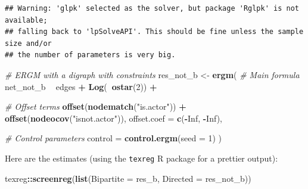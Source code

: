 \documentclass[]{book}
\newenvironment{Shaded}{\begin{snugshade}}{\end{snugshade}}
\newcommand{\CommentTok}[1]{\textcolor[rgb]{0.56,0.35,0.01}{\textit{#1}}}
\newcommand{\DataTypeTok}[1]{\textcolor[rgb]{0.13,0.29,0.53}{#1}}
\newcommand{\DecValTok}[1]{\textcolor[rgb]{0.00,0.00,0.81}{#1}}
\newcommand{\KeywordTok}[1]{\textcolor[rgb]{0.13,0.29,0.53}{\textbf{#1}}}
\newcommand{\NormalTok}[1]{#1}
\newcommand{\OperatorTok}[1]{\textcolor[rgb]{0.81,0.36,0.00}{\textbf{#1}}}
\newcommand{\OtherTok}[1]{\textcolor[rgb]{0.56,0.35,0.01}{#1}}
\newcommand{\StringTok}[1]{\textcolor[rgb]{0.31,0.60,0.02}{#1}}
\begin{document}
\begin{verbatim}
## Warning: 'glpk' selected as the solver, but package 'Rglpk' is not available;
## falling back to 'lpSolveAPI'. This should be fine unless the sample size and/or
## the number of parameters is very big.
\end{verbatim}

\begin{Shaded}
\begin{Highlighting}[]
\CommentTok{# ERGM with a digraph with constraints}
\NormalTok{res_not_b <-}\StringTok{ }\KeywordTok{ergm}\NormalTok{(}
  \CommentTok{# Main formula}
\NormalTok{  net_not_b }\OperatorTok{~}\StringTok{ }\NormalTok{edges }\OperatorTok{+}\StringTok{ }\KeywordTok{Log}\NormalTok{(}\OperatorTok{~}\KeywordTok{ostar}\NormalTok{(}\DecValTok{2}\NormalTok{)) }\OperatorTok{+}

\StringTok{  }\CommentTok{# Offset terms }
\StringTok{  }\KeywordTok{offset}\NormalTok{(}\KeywordTok{nodematch}\NormalTok{(}\StringTok{"is.actor"}\NormalTok{)) }\OperatorTok{+}\StringTok{ }\KeywordTok{offset}\NormalTok{(}\KeywordTok{nodeocov}\NormalTok{(}\StringTok{"isnot.actor"}\NormalTok{)),}
  \DataTypeTok{offset.coef =} \KeywordTok{c}\NormalTok{(}\OperatorTok{-}\OtherTok{Inf}\NormalTok{, }\OperatorTok{-}\OtherTok{Inf}\NormalTok{),}

  \CommentTok{# Control parameters}
  \DataTypeTok{control =} \KeywordTok{control.ergm}\NormalTok{(}\DataTypeTok{seed =} \DecValTok{1}\NormalTok{)}
\NormalTok{  )}
\end{Highlighting}
\end{Shaded}

Here are the estimates (using the \texttt{texreg} R package for a prettier output):

\begin{Shaded}
\begin{Highlighting}[]
\NormalTok{texreg}\OperatorTok{::}\KeywordTok{screenreg}\NormalTok{(}\KeywordTok{list}\NormalTok{(}\DataTypeTok{Bipartite =}\NormalTok{ res_b, }\DataTypeTok{Directed =}\NormalTok{ res_not_b))}
\end{Highlighting}
\end{Shaded}
\end{document}
